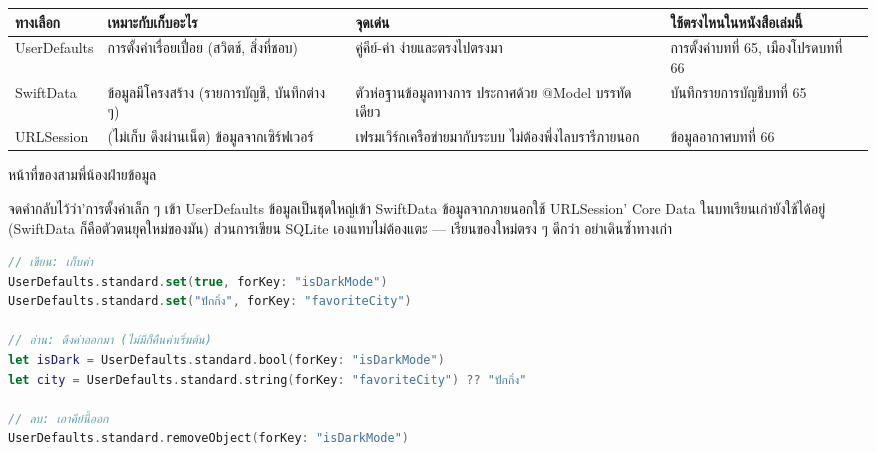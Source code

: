 


\begin{center}
\begin{tabularx}{\linewidth}{|X|X|X|X|}
\hline
\textbf{ทางเลือก} & \textbf{เหมาะกับเก็บอะไร} & \textbf{จุดเด่น} & \textbf{ใช้ตรงไหนในหนังสือเล่มนี้} \tabularnewline
\hline
UserDefaults & การตั้งค่าเรื่อยเปื่อย (สวิตช์, สิ่งที่ชอบ) & คู่คีย์-ค่า ง่ายและตรงไปตรงมา & การตั้งค่าบทที่ 65, เมืองโปรดบทที่ 66 \tabularnewline
SwiftData & ข้อมูลมีโครงสร้าง (รายการบัญชี, บันทึกต่าง ๆ) & ตัวห่อฐานข้อมูลทางการ ประกาศด้วย @Model บรรทัดเดียว & บันทึกรายการบัญชีบทที่ 65 \tabularnewline
URLSession & (ไม่เก็บ ดึงผ่านเน็ต) ข้อมูลจากเซิร์ฟเวอร์ & เฟรมเวิร์กเครือข่ายมากับระบบ ไม่ต้องพึ่งไลบรารีภายนอก & ข้อมูลอากาศบทที่ 66 \tabularnewline
\hline
\end{tabularx}
\end{center}

\begin{center}\small\color{gray}หน้าที่ของสามพี่น้องฝ่ายข้อมูล\end{center}

จดคำกลับไว้ว่า'การตั้งค่าเล็ก ๆ เข้า UserDefaults ข้อมูลเป็นชุดใหญ่เข้า SwiftData ข้อมูลจากภายนอกใช้ URLSession' Core Data ในบทเรียนเก่ายังใช้ได้อยู่ (SwiftData ก็คือตัวตนยุคใหม่ของมัน) ส่วนการเขียน SQLite เองแทบไม่ต้องแตะ — เรียนของใหม่ตรง ๆ ดีกว่า อย่าเดินซ้ำทางเก่า


\begin{lstlisting}[language=Swift]
// เขียน: เก็บค่า
UserDefaults.standard.set(true, forKey: "isDarkMode")
UserDefaults.standard.set("ปักกิ่ง", forKey: "favoriteCity")

// อ่าน: ดึงค่าออกมา (ไม่มีก็คืนค่าเริ่มต้น)
let isDark = UserDefaults.standard.bool(forKey: "isDarkMode")
let city = UserDefaults.standard.string(forKey: "favoriteCity") ?? "ปักกิ่ง"

// ลบ: เอาคีย์นี้ออก
UserDefaults.standard.removeObject(forKey: "isDarkMode")
\end{lstlisting}


